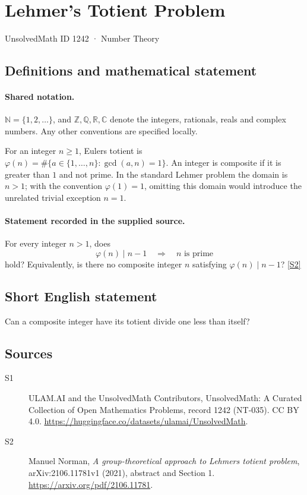 \documentclass[11pt]{article}
\newcommand{\sref}[2]{\hyperlink{source:#1:#2}{[S#2]}}
\begin{document}
\setcounter{section}{1241}
\section{Lehmer's Totient Problem}\label{1242}
{\small\sffamily UnsolvedMath ID 1242 · Number Theory}
\subsection{Definitions and mathematical statement}

\paragraph{Shared notation.}$\mathbb N=\{1,2,\ldots\}$, and $\mathbb Z,\mathbb Q,\mathbb R,\mathbb C$ denote the integers, rationals, reals and complex numbers. Any other conventions are specified locally.


For an integer $n\geq1$, Euler\textquotesingle s totient is $\varphi(n)=\#\{a\in\{1,\ldots,n\}:\gcd(a,n)=1\}$. An integer is composite if it is greater than $1$ and not prime. In the standard Lehmer problem the domain is $n>1$; with the convention $\varphi(1)=1$, omitting this domain would introduce the unrelated trivial exception $n=1$.
\paragraph{Statement recorded in the supplied source.}
For every integer $n>1$, does
\[
\varphi(n)\mid n-1\quad\Longrightarrow\quad n\text{ is prime}
\]
hold? Equivalently, is there no composite integer $n$ satisfying $\varphi(n)\mid n-1$? \sref{1242}{2}

\subsection{Short English statement}
Can a composite integer have its totient divide one less than itself?
\subsection{Sources}
\begin{description}
\item[\hypertarget{source:1242:1}{S1}] ULAM.AI and the UnsolvedMath Contributors, UnsolvedMath: A Curated Collection of Open Mathematics Problems, record 1242 (NT-035). CC BY 4.0. \url{https://huggingface.co/datasets/ulamai/UnsolvedMath}.
\item[\hypertarget{source:1242:2}{S2}] Manuel Norman, \emph{A group-theoretical approach to Lehmer\textquotesingle s totient problem}, arXiv:2106.11781v1 (2021), abstract and Section 1. \url{https://arxiv.org/pdf/2106.11781}.
\end{description}
\label{end:1242}
\end{document}

